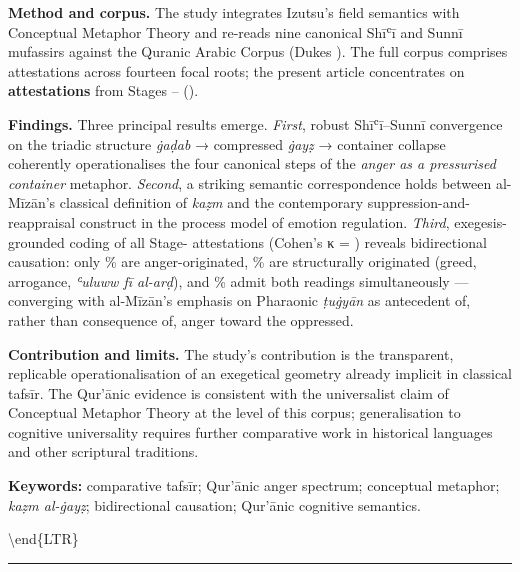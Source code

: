 \documentclass[12pt,a4paper]{article}
\newenvironment{englishabstract}
  {%
    \clearpage
    \begin{LTR}%
    \DefaultMathsDigits
    \englishbody
    \setstretch{1.25}%
    \setlength{\parindent}{0pt}%
    \setlength{\parskip}{0.6em plus 0.2em}%
  }%
  {\end{LTR}}
\begin{document}
\begin{englishabstract}
\noindent\textbf{Method and corpus.} The study integrates Izutsu’s field semantics with Conceptual Metaphor Theory and re-reads nine canonical Shīʿī and Sunnī mufassirs against the Quranic Arabic Corpus (Dukes ). The full corpus comprises  attestations across fourteen focal roots; the present article concentrates on \textbf{ attestations} from Stages – ().

\noindent\textbf{Findings.} Three principal results emerge. \textit{First}, robust Shīʿī–Sunnī convergence on the triadic structure \textit{ġaḍab} → compressed \textit{ġayẓ} → container collapse coherently operationalises the four canonical steps of the \textit{anger as a pressurised container} metaphor. \textit{Second}, a striking semantic correspondence holds between al-Mīzān’s classical definition of \textit{kaẓm} and the contemporary suppression-and-reappraisal construct in the process model of emotion regulation. \textit{Third}, exegesis-grounded coding of all  Stage- attestations (Cohen’s κ = ) reveals bidirectional causation: only \% are anger-originated, \% are structurally originated (greed, arrogance, \textit{ʿuluww fī al-arḍ}), and \% admit both readings simultaneously — converging with al-Mīzān’s emphasis on Pharaonic \textit{ṭuġyān} as antecedent of, rather than consequence of, anger toward the oppressed.

\noindent\textbf{Contribution and limits.} The study’s contribution is the transparent, replicable operationalisation of an exegetical geometry already implicit in classical tafsīr. The Qur’ānic evidence is consistent with the universalist claim of Conceptual Metaphor Theory at the level of this corpus; generalisation to cognitive universality requires further comparative work in historical languages and other scriptural traditions.

\vspace{4pt}

\noindent\textbf{Keywords:} comparative tafsīr; Qur’ānic anger spectrum; conceptual metaphor; \textit{kaẓm al-ġayẓ}; bidirectional causation; Qur’ānic cognitive semantics.

\end{englishabstract}
\endgroup

\textbackslash end\{LTR\}

\begin{center}\rule{0.5\linewidth}{0.5pt}\end{center}
\end{document}
